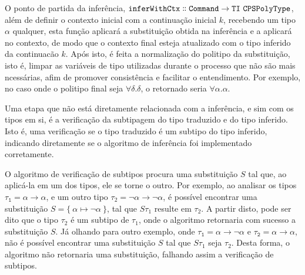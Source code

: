 O ponto de partida da inferência, $\mathtt{inferWithCtx \dblcolon Command \to TI\ CPSPolyType}$, além de definir o contexto inicial com a continuação inicial $k$, recebendo um tipo $\alpha$ qualquer, esta função aplicará a substituição obtida na inferência e a aplicará no contexto, de modo que o contexto final esteja atualizado com o tipo inferido da continuacão $k$.
Após isto, é feita a normalização do politipo da substituição, isto é, limpar as variáveis de tipo utilizadas durante o processo que não são mais ncessárias, afim de promover consistência e facilitar o entendimento.
Por exemplo, no caso onde o politipo final seja $\forall\delta.\delta$, o retornado seria $\forall\alpha.\alpha$.

Uma etapa que não está diretamente relacionada com a inferência, e sim com os tipos em si, é a verificação da subtipagem do tipo traduzido e do tipo inferido.
Isto é, uma verificação se o tipo traduzido é um subtipo do tipo inferido, indicando diretamente se o algoritmo de inferência foi implementado corretamente.

O algoritmo de verificação de subtipos procura uma substituição $S$ tal que, ao aplicá-la em um dos tipos, ele se torne o outro.
Por exemplo, ao analisar os tipos $\mathtt{\tau_1 = \alpha \to \alpha}$, e um outro tipo $\tau_2 = \neg\alpha \to \neg\alpha$, é possível encontrar uma substituição $S = \{\ \alpha \mapsto \neg\alpha \ \}$, tal que $S\tau_1$ resulte em $\tau_2$.
A partir disto, pode ser dito que o tipo $\tau_2$ é um subtipo de $\tau_1$, onde o algoritmo retornaria com sucesso a substituição $S$.
Já olhando para outro exemplo, onde $\mathtt{\tau_1 = \alpha \to \neg\alpha}$ e $\mathtt{\tau_2 = \alpha \to \alpha}$, não é possível encontrar uma substituição $S$ tal que $S\tau_1$ seja $\tau_2$.
Desta forma, o algoritmo não retornaria uma substituição, falhando assim a verificação de subtipos.
